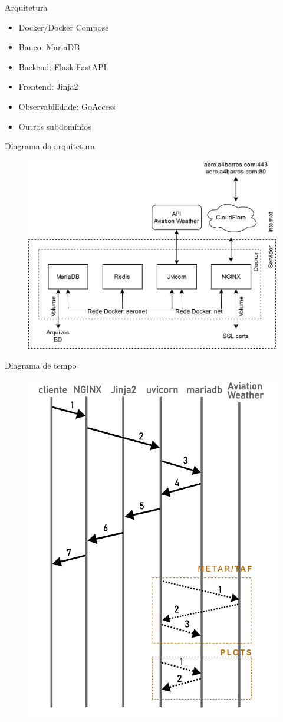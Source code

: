 \documentclass{beamer}
\begin{document}
\begin{frame}{Arquitetura}
    \begin{itemize}
        \item Docker/Docker Compose
        \item Banco: MariaDB
        \item Backend: \st{Flask} FastAPI
        \item Frontend: Jinja2
        \item Observabilidade: GoAccess
        \item Outros subdomínios
    \end{itemize}
\end{frame}

\begin{frame}{Diagrama da arquitetura}
    \begin{figure}[ht]
        \begin{center}
        \includegraphics[width=0.8\linewidth]{img/arquitetura.png}
        \label{fig:arquitetura}
        \end{center}
    \end{figure}
\end{frame}

\begin{frame}{Diagrama de tempo}
    \begin{figure}[ht]
        \begin{center}
        \includegraphics[width=0.4\linewidth]{img/diagrama-tempo.png}
        \label{fig:arquitetura}
        \end{center}
    \end{figure}
\end{frame}
\end{document}
